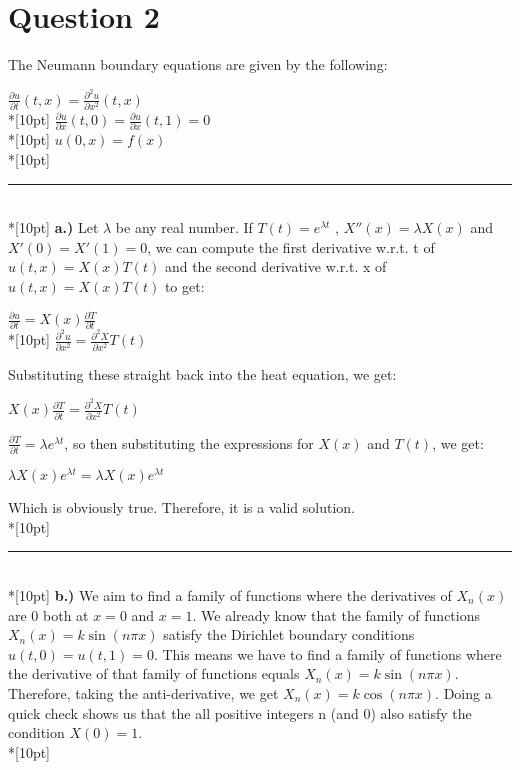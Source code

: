 \documentclass{article}
\begin{document}
\section{Question 2}
The Neumann boundary equations are given by the following:
\begin{center}
    \(\displaystyle \frac{\partial u}{\partial t}(t, x) = \frac{\partial^2u}{\partial x^2}(t, x)\)\\*[10pt]
    \(\displaystyle \frac{\partial u}{\partial x}(t, 0) = \frac{\partial u}{\partial x}(t, 1) = 0\)\\*[10pt]
    \(u(0, x) = f(x)\)\\*[10pt]
\end{center}
\rule{\linewidth}{0.2mm}\\*[10pt]
\textbf{a.)} Let \(\lambda\) be any real number. If \(T(t) = e^{\lambda t}\) , \(X''(x) = \lambda X(x)\) and \( X'(0) = X'(1) = 0\), we can compute the first derivative w.r.t. t of \(u(t, x) = X(x)T(t)\) and the second derivative w.r.t. x of \(u(t, x) = X(x)T(t)\) to get:
\begin{center}
    \(\displaystyle \frac{\partial u}{\partial t} = X(x) \frac{\partial T}{\partial t}\)\\*[10pt]
    \(\displaystyle \frac{\partial^2u}{\partial x^2} = \frac{\partial^2X}{\partial x^2}T(t)\)
\end{center}
Substituting these straight back into the heat equation, we get:
\begin{center}
    \(\displaystyle X(x)\frac{\partial T}{\partial t} = \frac{\partial^2X}{\partial x^2}T(t)\)
\end{center}
\(\displaystyle \frac{\partial T}{\partial t} = \lambda e^{\lambda t}\), so then substituting the expressions for \(X(x)\) and \(T(t)\), we get:
\begin{center}
    \(\lambda X(x) e^{\lambda t} = \lambda X(x)e^{\lambda t}\)
\end{center}
Which is obviously true. Therefore, it is a valid solution.\\*[10pt]
\rule{\linewidth}{0.2mm}\\*[10pt]
\textbf{b.)} We aim to find a family of functions where the derivatives of \(X_n(x)\) are 0 both at \(x = 0\) and \(x = 1\). We already know that the family of functions \(X_n(x) = k\sin(n\pi x)\) satisfy the Dirichlet boundary conditions \(u(t, 0) = u(t, 1) = 0\). This means we have to find a family of functions where the derivative of that family of functions equals \(X_n(x) = k\sin(n\pi x)\). Therefore, taking the anti-derivative, we get \(X_n(x) = k\cos(n\pi x)\). Doing a quick check shows us that the all positive integers n (and 0) also satisfy the condition \(X(0) = 1\).\\*[10pt]
\end{document}
